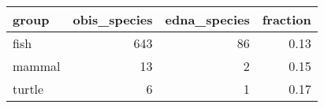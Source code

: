 \begin{longtable}{lrrr}
  \hline
group & obis\_species & edna\_species & fraction \\ 
  \hline
fish & 643 &  86 & 0.13 \\ 
  mammal &  13 &   2 & 0.15 \\ 
  turtle &   6 &   1 & 0.17 \\ 
   \hline
\hline
\end{longtable}
